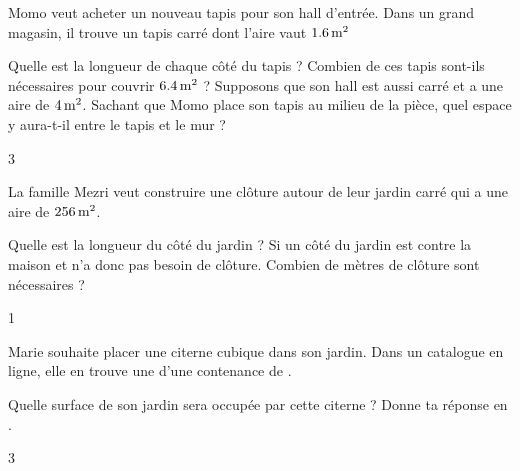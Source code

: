 \documentclass[a4paper,11pt]{report}
\begin{document}
\begin{exo}{
    Momo veut acheter un nouveau tapis pour son hall d'entrée. Dans un grand magasin, il trouve un tapis carré dont l'aire vaut $\tunit{1,6}{m^2}$

    \begin{tasks}
        \task Quelle est la longueur de chaque côté du tapis ?
        \task Combien de ces tapis sont-ils nécessaires pour couvrir $\tunit{6,4}{m^2}$ ?
        \task Supposons que son hall est aussi carré et a une aire de $\tunit{4}{m^2}$. Sachant que Momo place son tapis au milieu de la pièce, quel espace y aura-t-il entre le tapis et le mur ?
    \end{tasks}
}{3}    
\end{exo}


\begin{exo}{
    La famille Mezri veut construire une clôture autour de leur jardin carré qui a une aire de $\tunit{256}{m^2}$.

    \begin{tasks}
        \task Quelle est la longueur du côté du jardin ?
        \task Si un côté du jardin est contre la maison et n'a donc pas besoin de clôture. Combien de mètres de clôture sont nécessaires ?
    \end{tasks}
}{1}    
\end{exo}

\begin{exo}{
Marie souhaite placer une citerne cubique dans son jardin. Dans un catalogue en ligne, elle en trouve une d’une contenance de .

Quelle surface de son jardin sera occupée par cette citerne ? Donne ta réponse en .
}{3}    
\end{exo}
\end{document}
